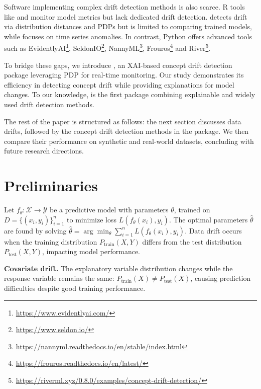 Software implementing complex drift detection methods is also scarce. R tools like  and  monitor model metrics but lack dedicated drift detection.  detects drift via distribution distances and PDPs but is limited to comparing trained models, while  focuses on time series anomalies. In contrast, Python offers advanced tools such as EvidentlyAI\footnote{\href{https://www.evidentlyai.com/}{https://www.evidentlyai.com/}}, SeldonIO\footnote{\href{https://www.seldon.io/}{https://www.seldon.io/}}, NannyML\footnote{\href{https://nannyml.readthedocs.io/en/stable/index.html}{https://nannyml.readthedocs.io/en/stable/index.html}}, Frouros\footnote{\href{https://frouros.readthedocs.io/en/latest/}{https://frouros.readthedocs.io/en/latest/}} and River\footnote{\href{https://riverml.xyz/0.8.0/examples/concept-drift-detection/}{https://riverml.xyz/0.8.0/examples/concept-drift-detection/}}.

To bridge these gaps, we introduce , an XAI-based concept drift detection package leveraging PDP for real-time monitoring. Our study demonstrates its efficiency in detecting concept drift while providing explanations for model changes. To our knowledge,  is the first package combining explainable and widely used drift detection methods.

The rest of the paper is structured as follows: the next section discusses data drifts, followed by the concept drift detection methods in the package. We then compare their performance on synthetic and real-world datasets, concluding with future research directions.

\hypertarget{preliminaries}{%
\section{Preliminaries}\label{preliminaries}}

Let \(f_{\theta}: \mathcal{X} \rightarrow \mathcal{Y}\) be a predictive model with parameters \(\theta\), trained on \(D = \{(x_i, y_i)\}_{i=1}^{n}\) to minimize loss \(L(f_{\theta}(x_i), y_i)\). The optimal parameters \(\hat{\theta}\) are found by solving \(\hat{\theta} = \arg \min_{\theta} \sum_{i=1}^{n} L(f_{\theta}(x_i), y_i)\). Data drift occurs when the training distribution \(P_{\text{train}}(X, Y)\) differs from the test distribution \(P_{\text{test}}(X, Y)\), impacting model performance.

\noindent \textbf{Covariate drift.} The explanatory variable distribution changes while the response variable remains the same: \(P_{\text{train}}(X) \neq P_{\text{test}}(X)\), causing prediction difficulties despite good training performance.

